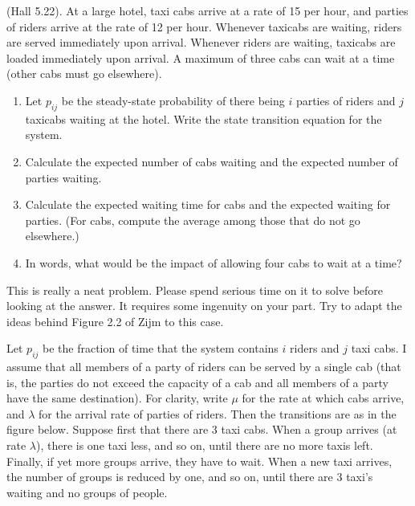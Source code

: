 \begin{exercise}
  (Hall 5.22). At a large hotel, taxi cabs arrive at a rate of 15 per
  hour, and parties of riders arrive at the rate of 12 per
  hour. Whenever taxicabs are waiting, riders are served immediately
  upon arrival. Whenever riders are waiting, taxicabs are loaded
  immediately upon arrival. A maximum of three cabs can wait at a time (other cabs must go elsewhere).
  \begin{enumerate}
  \item Let $p_{ij}$ be the steady-state probability of there being $i$ parties of riders and $j$ taxicabs waiting at the hotel. Write the state transition equation for the system. 
  \item Calculate the expected number of cabs waiting and the expected number of parties waiting.
  \item Calculate the expected waiting time for cabs and the expected waiting for parties. (For cabs, compute the average among those that do not go elsewhere.)
  \item In words, what would be the impact of allowing four cabs to wait at a time?
  \end{enumerate}
  \begin{hint}
This is really a neat problem. Please spend serious time on it to
solve before looking at the answer. It requires some ingenuity on your part.  Try to adapt the ideas behind Figure 2.2 of Zijm to this case.
  \end{hint}
    \begin{solution}
Let $p_{ij}$ be the fraction of time that the system contains $i$
riders and $j$ taxi cabs. I assume that all members of a party of
riders can be served by a single cab (that is, the parties do not
exceed the capacity of a cab and all members of a party have the same
destination). For clarity, write $\mu$ for the rate at which cabs
arrive, and $\lambda$ for the arrival rate of parties of riders.  Then
the transitions are as in the figure below. Suppose first that there
are $3$ taxi cabs. When a group arrives (at rate $\lambda$), there is
one taxi less, and so on, until there are no more taxis
left. Finally, if yet more groups arrive, they have to wait. When a
new taxi arrives, the number of groups is reduced by one, and so on,
until there are $3$ taxi's waiting and no groups of people.


    \begin{center}

\end{center}
\end{solution}
\end{exercise}
